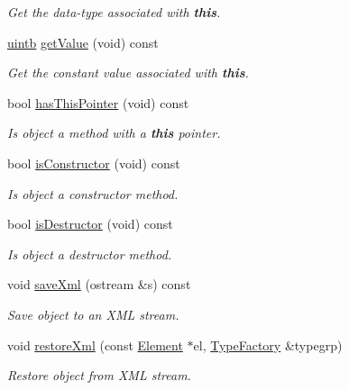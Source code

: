 \begin{DoxyCompactItemize}
\begin{DoxyCompactList}\small\item\em Get the data-\/type associated with {\bfseries{this}}. \end{DoxyCompactList}\item 
\mbox{\hyperlink{types_8h_a2db313c5d32a12b01d26ac9b3bca178f}{uintb}} \mbox{\hyperlink{class_c_pool_record_aaded70e1f90975f5a2115f98bcfae466}{get\+Value}} (void) const
\begin{DoxyCompactList}\small\item\em Get the constant value associated with {\bfseries{this}}. \end{DoxyCompactList}\item 
bool \mbox{\hyperlink{class_c_pool_record_aed45b0c5aa82d79039282045a43ee3d9}{has\+This\+Pointer}} (void) const
\begin{DoxyCompactList}\small\item\em Is object a method with a {\bfseries{this}} pointer. \end{DoxyCompactList}\item 
bool \mbox{\hyperlink{class_c_pool_record_a7ab36868403f7334cbd764bd57ac78a7}{is\+Constructor}} (void) const
\begin{DoxyCompactList}\small\item\em Is object a constructor method. \end{DoxyCompactList}\item 
bool \mbox{\hyperlink{class_c_pool_record_a87a39ecd1ef52ece95ee9a5290827ce4}{is\+Destructor}} (void) const
\begin{DoxyCompactList}\small\item\em Is object a destructor method. \end{DoxyCompactList}\item 
void \mbox{\hyperlink{class_c_pool_record_a3c44a419dc5e21167354c715fadcfa18}{save\+Xml}} (ostream \&s) const
\begin{DoxyCompactList}\small\item\em Save object to an X\+ML stream. \end{DoxyCompactList}\item 
void \mbox{\hyperlink{class_c_pool_record_a93e21b4afa8d1db68152b7d6e56c3413}{restore\+Xml}} (const \mbox{\hyperlink{class_element}{Element}} $\ast$el, \mbox{\hyperlink{class_type_factory}{Type\+Factory}} \&typegrp)
\begin{DoxyCompactList}\small\item\em Restore object from X\+ML stream. \end{DoxyCompactList}\end{DoxyCompactItemize}
